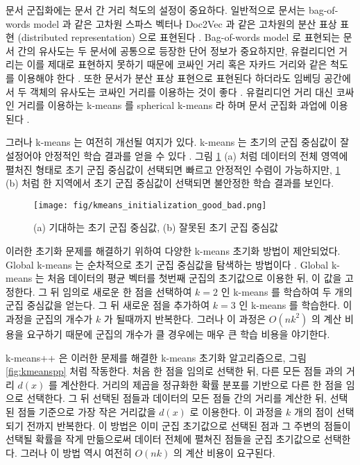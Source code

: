 \documentclass[oneside, ko,phd]{snuthesis_utf8_kor}
\begin{document}
문서 군집화에는 문서 간 거리 척도의 설정이 중요하다.
일반적으로 문서는 bag-of-words model 과 같은 고차원 스파스 벡터나 Doc2Vec 과 같은 고차원의 분산 표상 표현 (distributed representation) 으로 표현된다 \cite{le2014distributed, dai2015document}.
Bag-of-words model 로 표현되는 문서 간의 유사도는 두 문서에 공통으로 등장한 단어 정보가 중요하지만, 유컬리디언 거리는 이를 제대로 표현하지 못하기 때문에 코싸인 거리 혹은 자카드 거리와 같은 척도를 이용해야 한다 \cite{huang2008similarity}.
또한 문서가 분산 표상 표현으로 표현된다 하더라도 임베딩 공간에서 두 객체의 유사도는 코싸인 거리를 이용하는 것이 좋다 \cite{levy2015improving}.
유컬리디언 거리 대신 코싸인 거리를 이용하는 k-means 를 spherical k-means 라 하며 문서 군집화 과업에 이용된다 \cite{dhillon2002iterative, buchta2012spherical}.

그러나 k-means 는 여전히 개선될 여지가 있다.
k-means 는 초기의 군집 중심값이 잘 설정어야 안정적인 학습 결과를 얻을 수 있다 \cite{arthur2007k}.
그림 \ref{fig:initialization_good_bad} (a) 처럼 데이터의 전체 영역에 펼처진 형태로 초기 군집 중심값이 선택되면 빠르고 안정적인 수렴이 가능하지만, \ref{fig:initialization_good_bad} (b) 처럼 한 지역에서 초기 군집 중심값이 선택되면 불안정한 학습 결과를 보인다.

\begin{figure}[H]
\centering
\texttt{[image: fig/kmeans\_initialization\_good\_bad.png]}
\caption{(a) 기대하는 초기 군집 중심값, (b) 잘못된 초기 군집 중심값}
\label{fig:initialization_good_bad}
\end{figure}

이러한 초기화 문제를 해결하기 위하여 다양한 k-means 초기화 방법이 제안되었다.
Global k-means 는 순차적으로 초기 군집 중심값을 탐색하는 방법이다 \cite{likas2003global, bagirov2008modified}.
Global k-means 는 처음 데이터의 평균 벡터를 첫번째 군집의 초기값으로 이용한 뒤, 이 값을 고정한다.
그 뒤 임의로 새로운 한 점을 선택하여 $k=2$ 인 k-means 를 학습하여 두 개의 군집 중심값을 얻는다.
그 뒤 새로운 점을 추가하여 $k=3$ 인 k-means 를 학습한다.
이 과정을 군집의 개수가 $k$ 가 될때까지 반복한다.
그러나 이 과정은 $O(nk^2)$ 의 계산 비용을 요구하기 때문에 군집의 개수가 클 경우에는 매우 큰 학습 비용을 야기한다.

k-means++ \cite{arthur2007k} 은 이러한 문제를 해결한 k-means 초기화 알고리즘으로, 그림 \ref{fig:kmeanspp} 처럼 작동한다.
처음 한 점을 임의로 선택한 뒤, 다른 모든 점들 과의 거리 $d(x)$ 를 계산한다.
거리의 제곱을 정규화한 확률 분포를 기반으로 다른 한 점을 임으로 선택한다.
그 뒤 선택된 점들과 데이터의 모든 점들 간의 거리를 계산한 뒤, 선택된 점들 기준으로 가장 작은 거리값을 $d(x)$ 로 이용한다.
이 과정을 $k$ 개의 점이 선택되기 전까지 반복한다.
이 방법은 이미 군집 초기값으로 선택된 점과 그 주변의 점들이 선택될 확률을 작게 만듦으로써 데이터 전체에 펼쳐진 점들을 군집 초기값으로 선택한다.
그러나 이 방법 역시 여전히 $O(nk)$ 의 계산 비용이 요구된다.
\end{document}
